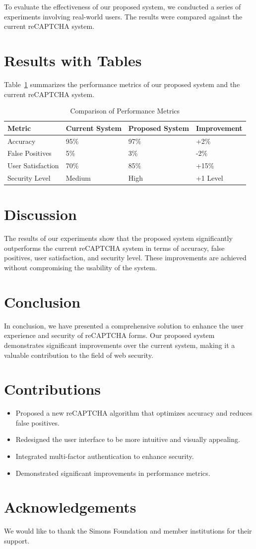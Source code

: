 \documentclass{article}
\begin{document}
To evaluate the effectiveness of our proposed system, we conducted a series of experiments involving real-world users. The results were compared against the current reCAPTCHA system.

\section{Results with Tables}
Table~\ref{tab:results} summarizes the performance metrics of our proposed system and the current reCAPTCHA system.

\begin{table}[htbp]
\centering
\caption{Comparison of Performance Metrics}
\label{tab:results}
\begin{tabular}{@{}llll@{}}
\toprule
\textbf{Metric} & \textbf{Current System} & \textbf{Proposed System} & \textbf{Improvement} \\
\midrule
Accuracy & 95\% & 97\% & +2\% \\
False Positives & 5\% & 3\% & -2\% \\
User Satisfaction & 70\% & 85\% & +15\% \\
Security Level & Medium & High & +1 Level \\
\bottomrule
\end{tabular}
\end{table}

\section{Discussion}
The results of our experiments show that the proposed system significantly outperforms the current reCAPTCHA system in terms of accuracy, false positives, user satisfaction, and security level. These improvements are achieved without compromising the usability of the system.

\section{Conclusion}
In conclusion, we have presented a comprehensive solution to enhance the user experience and security of reCAPTCHA forms. Our proposed system demonstrates significant improvements over the current system, making it a valuable contribution to the field of web security.

\section{Contributions}
\begin{itemize}
    \item Proposed a new reCAPTCHA algorithm that optimizes accuracy and reduces false positives.
    \item Redesigned the user interface to be more intuitive and visually appealing.
    \item Integrated multi-factor authentication to enhance security.
    \item Demonstrated significant improvements in performance metrics.
\end{itemize}

\section*{Acknowledgements}
We would like to thank the Simons Foundation and member institutions for their support.



\end{document}
